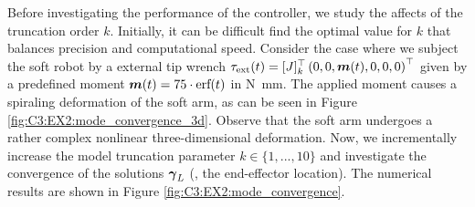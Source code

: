 \begin{example}
  \label{ex:C3:convergence}
 Before investigating the performance of the controller, we study the affects of the truncation order $k$. Initially, it can be difficult find the optimal value for $k$ that balances precision and computational speed. Consider the case where we subject the soft robot by a external tip wrench $\tau_\textrm{ext}(t) = [J]_k^\top \left(0,0,{\boldsymbol{m}}(t),0,0,0 \right)^\top$ given by a predefined moment ${\boldsymbol{m}}(t) = 75 \cdot \textrm{erf}(t)$ in \si{\newton \milli \meter}. The applied moment causes a spiraling deformation of the soft arm, as can be seen in Figure \ref{fig:C3:EX2:mode_convergence_3d}. Observe that the soft arm undergoes a rather complex nonlinear three-dimensional deformation. Now, we incrementally increase the model truncation parameter $k \in \{1,...,10\}$ and investigate the convergence of the solutions ${\boldsymbol{\gamma}}_L$ (\ie, the end-effector location). The numerical results are shown in Figure \ref{fig:C3:EX2:mode_convergence}. 
 

\end{example}
